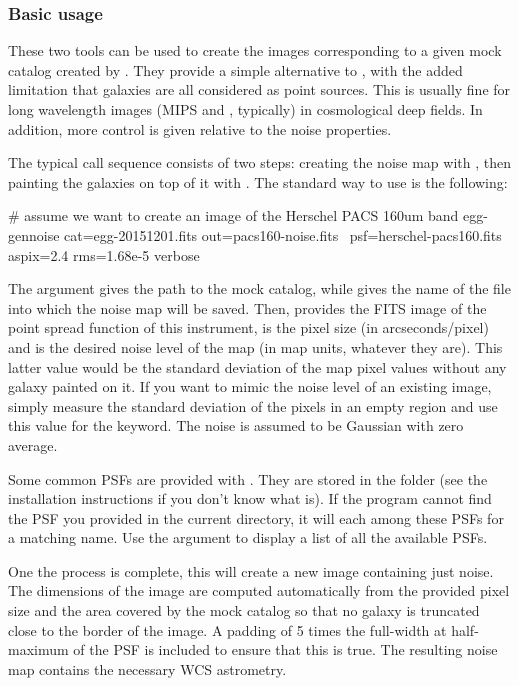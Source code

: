 \subsubsection{Basic usage}

These two tools can be used to create the images corresponding to a given mock catalog created by . They provide a simple alternative to \skymaker, with the added limitation that galaxies are all considered as point sources. This is usually fine for long wavelength images (\spitzer MIPS and \herschel, typically) in cosmological deep fields. In addition, more control is given relative to the noise properties.

The typical call sequence consists of two steps: creating the noise map with , then painting the galaxies on top of it with . The standard way to use  is the following:
\begin{bashcode}
# assume we want to create an image of the Herschel PACS 160um band
egg-gennoise cat=egg-20151201.fits out=pacs160-noise.fits \
    psf=herschel-pacs160.fits aspix=2.4 rms=1.68e-5 verbose
\end{bashcode}
The argument  gives the path to the mock catalog, while  gives the name of the file into which the noise map will be saved. Then,  provides the FITS image of the point spread function of this instrument,  is the pixel size (in arcseconds/pixel) and  is the desired noise level of the map (in map units, whatever they are). This latter value would be the standard deviation of the map pixel values without any galaxy painted on it. If you want to mimic the noise level of an existing image, simply measure the standard deviation of the pixels in an empty region and use this value for the  keyword. The noise is assumed to be Gaussian with zero average.

Some common PSFs are provided with \egg. They are stored in the
folder (see the installation instructions if you don't know what
 is). If the program cannot find the PSF you provided in the current directory, it will each among these PSFs for a matching name. Use the  argument to display a list of all the available PSFs.

One the process is complete, this will create a new image containing just noise. The dimensions of the image are computed automatically from the provided pixel size and the area covered by the mock catalog so that no galaxy is truncated close to the border of the image. A padding of 5 times the full-width at half-maximum of the PSF is included to ensure that this is true. The resulting noise map contains the necessary WCS astrometry.

